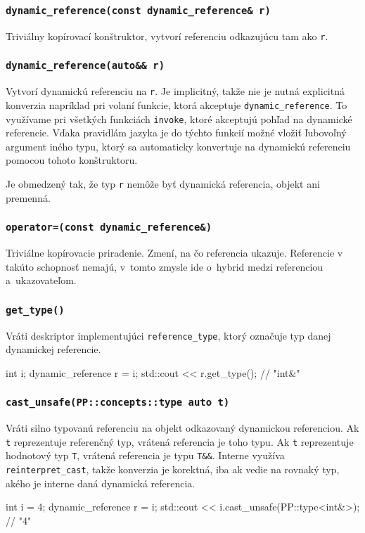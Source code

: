 \subsubsection{\texttt{dynamic\_reference(const dynamic\_reference\& r)}}

Triviálny kopírovací konštruktor, vytvorí referenciu odkazujúcu tam ako \texttt{r}.

\subsubsection{\texttt{dynamic\_reference(auto\&\& r)}}

Vytvorí dynamickú referenciu na \texttt{r}. Je implicitný, takže nie je nutná explicitná konverzia napríklad pri volaní funkcie, ktorá akceptuje \texttt{dynamic\_reference}. To využívame pri všetkých funkciách \texttt{invoke}, ktoré akceptujú pohľad na dynamické referencie. Vďaka pravidlám jazyka je do týchto funkcií možné vložiť ľubovoľný argument iného typu, ktorý sa automaticky konvertuje na dynamickú referenciu pomocou tohoto konštruktoru.

Je obmedzený tak, že typ \texttt{r} nemôže byť dynamická referencia, objekt ani premenná.

\subsubsection{\texttt{operator=(const dynamic\_reference\&)}}

Triviálne kopírovacie priradenie. Zmení, na čo referencia ukazuje. Referencie v~\Cpp{} takúto schopnosť nemajú, v~tomto zmysle ide o~hybrid medzi referenciou a~ukazovateľom.

\subsubsection{\texttt{get\_type()}}

Vráti deskriptor implementujúci \texttt{reference\_type}, ktorý označuje typ danej dynamickej referencie.
\begin{code}
int i;
dynamic_reference r = i;
std::cout << r.get_type(); // "int&"
\end{code}

\subsubsection{\texttt{cast\_unsafe(PP::concepts::type auto t)}}

Vráti silno typovanú referenciu na objekt odkazovaný dynamickou referenciou. Ak \texttt{t} reprezentuje referenčný typ, vrátená referencia je toho typu. Ak \texttt{t} reprezentuje hodnotový typ \texttt{T}, vrátená referencia je typu \texttt{T\&\&}.
Interne využíva \texttt{reinterpret\_cast}, takže konverzia je korektná, iba ak vedie na rovnaký typ, akého je interne daná dynamická referencia.
\begin{code}
int i = 4;
dynamic_reference r = i;
std::cout << i.cast_unsafe(PP::type<int&>); // "4"
\end{code}

